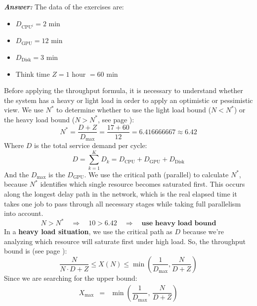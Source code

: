 \begin{enumerate}
    \textcolor{Green3}{\textbf{\emph{Answer:}}} The data of the exercises are:
    \begin{itemize}
        \item $D_{\text{CPU}^{i}} = 2$ min
        \item $D_{\text{GPU}} = 12$ min
        \item $D_{\text{Disk}} = 3$ min
        \item Think time $Z = 1$ hour $= 60$ min
    \end{itemize}
    Before applying the throughput formula, it is necessary to understand whether the system has a heavy or light load in order to apply an optimistic or pessimistic view. We use $N^{*}$ to determine whether to use the light load bound ($N < N^{*}$) or the heavy load bound ($N > N^{*}$, see page \pageref{eq: N start - limit population size}):
    \begin{equation*}
        N^{*} = \dfrac{D+Z}{D_{\max}} = \dfrac{17 + 60}{12} = 6.416666667 \approx 6.42
    \end{equation*}
    Where $D$ is the total service demand per cycle:
    \begin{equation*}
        D = \displaystyle\sum_{k = 1}^{K} D_{k} = D_{\text{CPU}} + D_{\text{GPU}} + D_{\text{Disk}}
    \end{equation*}
    And the $D_{\max}$ is the $D_{\text{GPU}}$. We use the critical path (parallel) to calculate $N^{*}$, because $N^{*}$ identifies which single resource becomes saturated first. This occurs along the longest delay path in the network, which is the real elapsed time it takes one job to pass through all necessary stages while taking full parallelism into account.
    \begin{equation*}
        N > N^{*} \quad \Rightarrow \quad 10 > 6.42 \quad \Rightarrow \quad \textbf{use heavy load bound}
    \end{equation*}
    In a \textbf{heavy load situation}, we use the critical path as $D$ because we're analyzing which resource will saturate first under high load. So, the throughput bound is (see page \pageref{eq: throughput limits - heavy load}):
    \begin{equation*}
        \dfrac{N}{N \cdot D + Z} \le X(N) \le \min\left(\dfrac{1}{D_{\max}}, \dfrac{N}{D+Z}\right)
    \end{equation*}
    Since we are searching for the upper bound:
    \begin{equation*}
        \begin{array}{rcl}
            X_{\max} &=& \min\left(\dfrac{1}{D_{\max}},\, \dfrac{N}{D+Z}\right) \\ [1.5em]

\end{array}
\end{equation*}
\end{enumerate}
